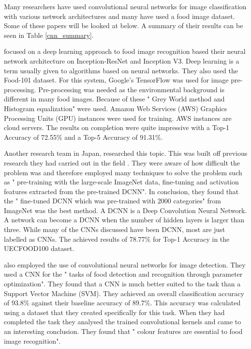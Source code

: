Many researchers have used convolutional neural networks for image
classification with various network architectures and many have used a food image dataset.
Some of these papers will be looked at below.
A summary of their results can be seen in Table \ref{cnn_summary}.

\parencite{deepLearning} focused on a deep learning approach to food image recognition based
their neural network architecture on Inception-ResNet and Inception V3.
Deep learning is a term usually given to algorithms based on neural networks.
They also used the Food-101 dataset. For this system, Google's
TensorFlow was used for image pre-processing. Pre-processing was needed as the
environmental background is different in many food images. Because of these
" Grey World method and Histogram equalization" \parencite{deepLearning} were
used.
Amazon Web Services (AWS) Graphics Processing Units (GPU) instances were used for training.
AWS instances are cloud servers.
The results on completion were quite impressive with a Top-1 Accuracy of 72.55\% and a Top-5 Accuracy of 91.31\%.

Another research team in Japan, \parencite{yanaiFood} researched this topic. This was built off previous research they had carried out in the field \parencite{kawano2014food}.
They were aware of how
difficult the problem was and therefore employed many techniques to solve the
problem such as " pre-training with the large-scale ImageNet data, fine-tuning
and activation features extracted from the pre-trained DCNN". 
In conclusion, they found that the " fine-tuned DCNN which was pre-trained
with 2000 categories" from ImageNet was the best method. A
DCNN is a Deep Convolution Neural Network. 
A network can become a DCNN when the number of hidden layers is larger than three.
While many of the CNNs discussed have been DCNN, most are just labelled as CNNs.
The achieved results of 78.77\% for Top-1 Accuracy in the UECFOOD100 dataset.

\parencite{kagayaFood} also employed the use of convolutional neural networks for
image detection. They used a CNN for the " tasks of food detection and recognition
through parameter optimization".
They found that a CNN is much better suited to the task than a Support Vector
Machine (SVM). They achieved an overall classification accuracy of 93.8\%
against their baseline accuracy of 89.7\%. This accuracy
was calculated using a dataset that they created specifically for this task.
When they had completed the task they analysed the trained convolutional kernels
and came to an interesting conclusion. They found that " colour features are
essential to food image recognition".


